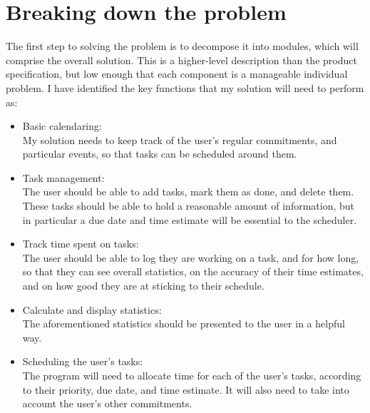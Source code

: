 \documentclass{article}
\begin{document}
\section{Breaking down the problem}
The first step to solving the problem is to decompose it into modules,
which will comprise the overall solution.
This is a higher-level description than the product specification,
but low enough that each component is a manageable individual problem.
I have identified the key functions that my solution will need to perform as:
\begin{samepage}
	\begin{itemize}
		\item Basic calendaring:\\
		      My solution needs to keep track of the user's regular commitments,
		      and particular events,
		      so that tasks can be scheduled around them.
		\item Task management:\\
		      The user should be able to add tasks,
		      mark them as done,
		      and delete them.
		      These tasks should be able to hold a reasonable amount of information,
		      but in particular a due date and time estimate will be essential to the scheduler.
		\item Track time spent on tasks:\\
		      The user should be able to log they are working on a task,
		      and for how long,
		      so that they can see overall statistics,
		      on the accuracy of their time estimates,
		      and on how good they are at sticking to their schedule.
		\item Calculate and display statistics:\\
		      The aforementioned statistics should be presented to the user in a helpful way.
		\item Scheduling the user's tasks:\\
		      The program will need to allocate time for each of the user's tasks,
		      according to their priority,
		      due date,
		      and time estimate.
		      It will also need to take into account the user's other commitments.
	\end{itemize}
\end{samepage}
\end{document}

